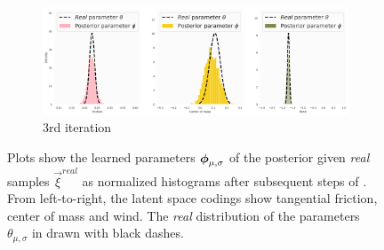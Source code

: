 \begin{figure}
\begin{subfigure}{\textwidth}
  \includegraphics[width=1.0\linewidth]{img/windyslope/latent-representation/iter4_10_style}
  \caption{3rd iteration}
\end{subfigure}
\caption{Plots show the learned parameters $\boldsymbol{\phi}_{\mu, \sigma}$ of the posterior given \emph{real} samples $\vec{\xi}^{real}$ as normalized histograms after subsequent steps of \dettostoc{}.
From left-to-right, the latent space codings show tangential friction, center of mass and wind. %
The \emph{real} distribution of the parameters $\theta_{\mu, \sigma}$ in drawn with black dashes.}
\label{fig:windyslope_latent_space_full}
\end{figure}

